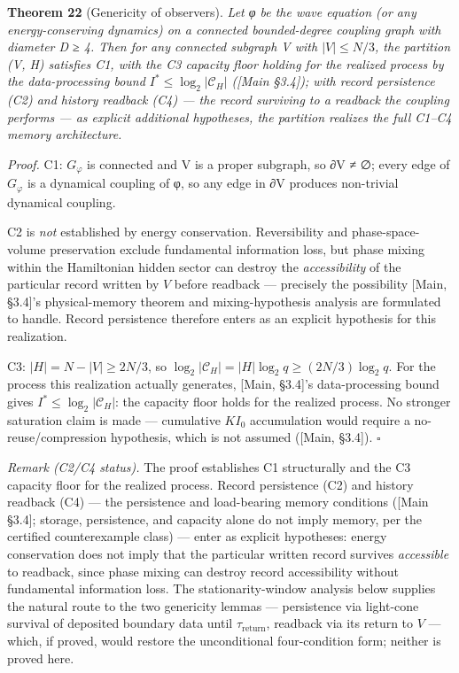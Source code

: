 \documentclass[
]{article}
\begin{document}
\textbf{Theorem 22} (Genericity of observers). \emph{Let φ be the wave
equation (or any energy-conserving dynamics) on a connected
bounded-degree coupling graph with diameter D ≥ 4. Then for any
connected subgraph V with \(|V| \leq N/3\), the partition (V, H)
satisfies C1, with the C3 capacity floor holding for the realized
process by the data-processing bound \(I^* \leq \log_2|\mathcal{C}_H|\)
({[}Main §3.4{]}); with record persistence (C2) and history readback
(C4) --- the record surviving to a readback the coupling performs --- as
explicit additional hypotheses, the partition realizes the full C1--C4
memory architecture.}

\emph{Proof.} C1: \(G_\varphi\) is connected and V is a proper subgraph,
so ∂V ≠ ∅; every edge of \(G_\varphi\) is a dynamical coupling of φ, so
any edge in ∂V produces non-trivial dynamical coupling.

C2 is \emph{not} established by energy conservation. Reversibility and
phase-space-volume preservation exclude fundamental information loss,
but phase mixing within the Hamiltonian hidden sector can destroy the
\emph{accessibility} of the particular record written by \(V\) before
readback --- precisely the possibility {[}Main, §3.4{]}'s
physical-memory theorem and mixing-hypothesis analysis are formulated to
handle. Record persistence therefore enters as an explicit hypothesis
for this realization.

C3: \(|H| = N - |V| \geq 2N/3\), so
\(\log_2|\mathcal{C}_H| = |H| \log_2 q \geq (2N/3)\log_2 q\). For the
process this realization actually generates, {[}Main, §3.4{]}'s
data-processing bound gives \(I^* \leq \log_2|\mathcal{C}_H|\): the
capacity floor holds for the realized process. No stronger saturation
claim is made --- cumulative \(K I_0\) accumulation would require a
no-reuse/compression hypothesis, which is not assumed ({[}Main,
§3.4{]}). \(\square\)

\emph{Remark (C2/C4 status).} The proof establishes C1 structurally and
the C3 capacity floor for the realized process. Record persistence (C2)
and history readback (C4) --- the persistence and load-bearing memory
conditions ({[}Main §3.4{]}; storage, persistence, and capacity alone do
not imply memory, per the certified counterexample class) --- enter as
explicit hypotheses: energy conservation does not imply that the
particular written record survives \emph{accessible} to readback, since
phase mixing can destroy record accessibility without fundamental
information loss. The stationarity-window analysis below supplies the
natural route to the two genericity lemmas --- persistence via
light-cone survival of deposited boundary data until
\(\tau_{\mathrm{return}}\), readback via its return to \(V\) --- which,
if proved, would restore the unconditional four-condition form; neither
is proved here.
\end{document}
